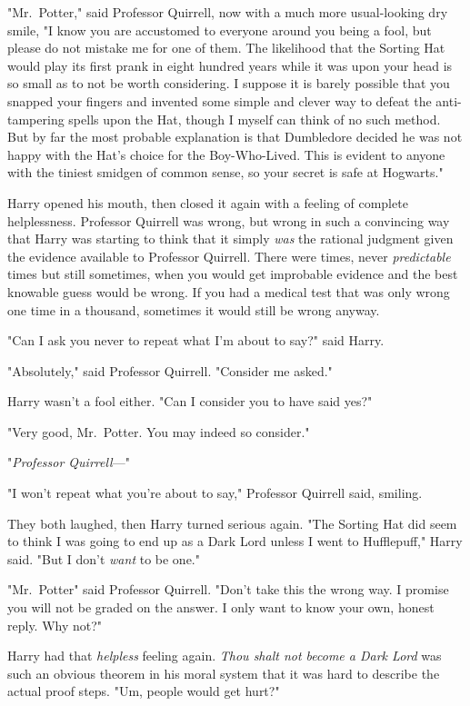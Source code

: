 "Mr.~Potter," said Professor Quirrell, now with a much more usual-looking dry
smile, "I know you are accustomed to everyone around you being a fool, but
please do not mistake me for one of them. The likelihood that the Sorting Hat
would play its first prank in eight hundred years while it was upon your head
is so small as to not be worth considering. I suppose it is barely possible
that you snapped your fingers and invented some simple and clever way to defeat
the anti-tampering spells upon the Hat, though I myself can think of no such
method. But by far the most probable explanation is that Dumbledore decided he
was not happy with the Hat's choice for the Boy-Who-Lived. This is evident to
anyone with the tiniest smidgen of common sense, so your secret is safe at
Hogwarts."

Harry opened his mouth, then closed it again with a feeling of complete
helplessness. Professor Quirrell was wrong, but wrong in such a convincing way
that Harry was starting to think that it simply \emph{was} the rational
judgment given the evidence available to Professor Quirrell. There were times,
never \emph{predictable} times but still sometimes, when you would get
improbable evidence and the best knowable guess would be wrong. If you had a
medical test that was only wrong one time in a thousand, sometimes it would
still be wrong anyway.

"Can I ask you never to repeat what I'm about to say?" said Harry.

"Absolutely," said Professor Quirrell. "Consider me asked."

Harry wasn't a fool either. "Can I consider you to have said yes?"

"Very good, Mr.~Potter. You may indeed so consider."

"\emph{Professor Quirrell}—"

"I won't repeat what you're about to say," Professor Quirrell said, smiling.

They both laughed, then Harry turned serious again. "The Sorting Hat did seem
to think I was going to end up as a Dark Lord unless I went to Hufflepuff,"
Harry said. "But I don't \emph{want} to be one."

"Mr.~Potter{\el}" said Professor Quirrell. "Don't take this the wrong way. I
promise you will not be graded on the answer. I only want to know your own,
honest reply. Why not?"

Harry had that \emph{helpless} feeling again. \emph{Thou shalt not become a
Dark Lord} was such an obvious theorem in his moral system that it was hard to
describe the actual proof steps. "Um, people would get hurt?"


